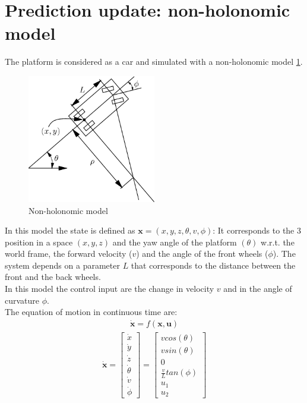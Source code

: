 \section{Prediction update: non-holonomic model}
The platform is considered as a car and simulated with a non-holonomic model \ref{fig:nonholonomicmodel}. 
\begin{figure}[!ht]
    \centering
    \includegraphics[width=0.5\textwidth]{img/non_holonomic_model.png}
    \caption{Non-holonomic model}
    \label{fig:nonholonomicmodel}
\end{figure}
In this model the state is defined as $\boldsymbol{x} = (x, y, z,\theta , v, \phi)$:
It corresponds to the 3 position in a space $(x,y,z)$ and the yaw angle of the platform $(\theta)$ w.r.t. the world frame, the forward velocity ($v$) and the angle of the front wheels ($\phi$). The system depends on a parameter $L$ that corresponds to the distance between the front and the back wheels.\\
In this model the control input are the change in velocity $v$ and in the angle of curvature $\phi$. \\
The equation of motion in continuous time are:
\begin{align}
\boldsymbol{\dot{x}} = f(\boldsymbol{x},\boldsymbol{u}) \nonumber
\end{align}
\begin{align}
\boldsymbol{\dot{x}} = 
\begin{bmatrix}
\dot{x}  \\[10pt]
\dot{y}  \\[10pt]
\dot{z} \\[10pt]
\dot{\theta} \\[10pt]
\dot{v}  \\[10pt]
\dot{\phi}
\end{bmatrix}
= 
\begin{bmatrix}
v cos(\theta) \\[10pt]
v sin(\theta) \\[10pt]
 0 \\[10pt]
\frac{v}{L}tan(\phi)\\[10pt]
u_1 \\[10pt]
 u_2 
\end{bmatrix}
\label{eq:ekfcomponents}
\end{align}
